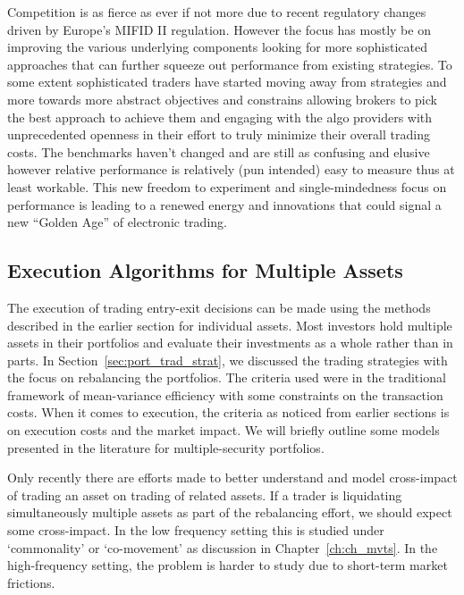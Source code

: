 Competition is as fierce as ever if not more due to recent regulatory changes driven by Europe's MIFID II regulation.  However the focus has mostly be on improving the various underlying components looking for more sophisticated approaches that can further squeeze out performance from existing strategies. To some extent sophisticated traders have started moving away from strategies and more towards more abstract objectives and constrains allowing brokers to pick the best approach to achieve them and engaging with the algo providers with unprecedented openness in their effort to truly minimize their overall trading costs. The benchmarks haven't changed and are still as confusing and elusive however relative performance is relatively (pun intended) easy to measure thus at least workable. This new freedom to experiment and single-mindedness focus on performance is leading to a renewed energy and innovations that could signal a new ``Golden Age'' of electronic trading.



\subsection{Execution Algorithms for Multiple Assets}


The execution of trading entry-exit decisions can be made using the methods described in the earlier section for individual assets. Most investors hold multiple assets in their portfolios and evaluate their investments as a whole rather than in parts. In Section~\ref{sec:port_trad_strat}, we discussed the trading strategies with the focus on rebalancing the portfolios. The criteria used were in the traditional framework of mean-variance efficiency with some constraints on the transaction costs. When it comes to execution, the criteria as noticed from earlier sections is on execution costs and the market impact. We will briefly outline some models presented in the literature for multiple-security portfolios.


Only recently there are efforts made to better understand and model cross-impact of trading an asset on trading of related assets. If a trader is liquidating simultaneously multiple assets as part of the rebalancing effort, we should expect some cross-impact. In the low frequency setting this is studied under `commonality' or `co-movement' as discussion in Chapter~\ref{ch:ch_mvts}. In the high-frequency setting, the problem is harder to study due to short-term market frictions. 



